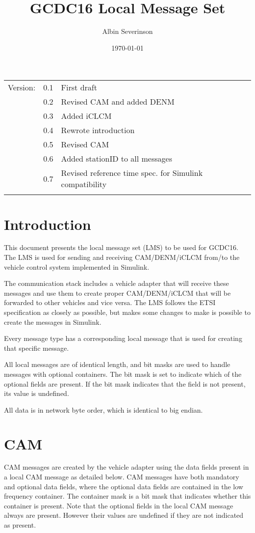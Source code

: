 \documentclass[11pt]{article}
\author{Albin Severinson}
\date{\today}
\title{GCDC16 Local Message Set}
\begin{document}
\maketitle
\tableofcontents

\begin{center}
\begin{tabular}{lrl}
Version: & 0.1 & First draft\\
 & 0.2 & Revised CAM and added DENM\\
 & 0.3 & Added iCLCM\\
 & 0.4 & Rewrote introduction\\
 & 0.5 & Revised CAM\\
 & 0.6 & Added stationID to all messages\\
 & 0.7 & Revised reference time spec. for Simulink compatibility\\
 &  & \\
\end{tabular}
\end{center}

\newpage
\section{Introduction}
\label{sec:orgheadline1}
This document presents the local message set (LMS) to be used for
GCDC16. The LMS is used for sending and receiving CAM/DENM/iCLCM
from/to the vehicle control system implemented in Simulink.

The communication stack includes a vehicle adapter that will receive
these messages and use them to create proper CAM/DENM/iCLCM
that will be forwarded to other vehicles and vice versa. The LMS
follows the ETSI specification as closely as possible, but makes some
changes to make is possible to create the messages in Simulink.

Every message type has a corresponding local message that is used for
creating that specific message. 

All local messages are of identical length, and bit masks are used to
handle messages with optional containers. The bit mask is set to
indicate which of the optional fields are present. If the bit mask
indicates that the field is not present, its value is undefined.

All data is in network byte order, which is identical to big endian.

\newpage
\section{CAM}
\label{sec:orgheadline2}
CAM messages are created by the vehicle adapter using the data fields
present in a local CAM message as detailed below. CAM messages have
both mandatory and optional data fields, where the optional data
fields are contained in the low frequency container. The container
mask is a bit mask that indicates whether this container is present.
Note that the optional fields in the local CAM message always are
present. However their values are undefined if they are not indicated
as present.
\end{document}
